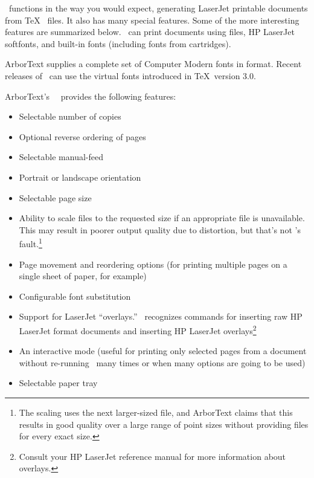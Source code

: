 \dvilaserhp\ functions in the way you would expect, generating
LaserJet printable documents from \TeX\  files.  It also
has many special features.  Some of the more interesting features
are summarized below.  \dvilaserhp\ can print documents
using  files, HP LaserJet softfonts, and built-in fonts
(including fonts from cartridges).

ArborText supplies a complete set of Computer Modern fonts in  format.
Recent releases of \dvilaserhp\ can use the virtual fonts introduced in \TeX\
version 3.0.

ArborText's \dvilaserhp\ \dvidriver\ provides the following features:

\begin{itemize}
  \item Selectable number of copies
  \item Optional reverse ordering of pages
  \item Selectable manual-feed
  \item Portrait or landscape orientation
  \item Selectable page size
  \item Ability to scale  files to the requested size if an appropriate
        \ext{PK} file is unavailable.  This may result in poorer output
        quality due to distortion, but that's not \dvilaserhp's 
        fault.\footnote{The scaling uses the next larger-sized  file,
        and ArborText claims that this results in good quality over a large 
        range of point sizes without providing \ext{PK} files for every 
        exact size.}
  \item Page movement and reordering options (for printing multiple pages
        on a single sheet of paper, for example)
  \item Configurable font substitution
  \item Support for LaserJet ``overlays.''  \dvilaserhp\ recognizes 
        \cs{special} commands for inserting raw HP LaserJet format documents
        and inserting HP LaserJet overlays\footnote{Consult your HP LaserJet 
        reference manual for more information about overlays.}
  \item An interactive mode (useful for printing only selected pages from
        a document without re-running \dvilaserhp\ many times or when many
        options are going to be used)
  \item Selectable paper tray
\end{itemize}

